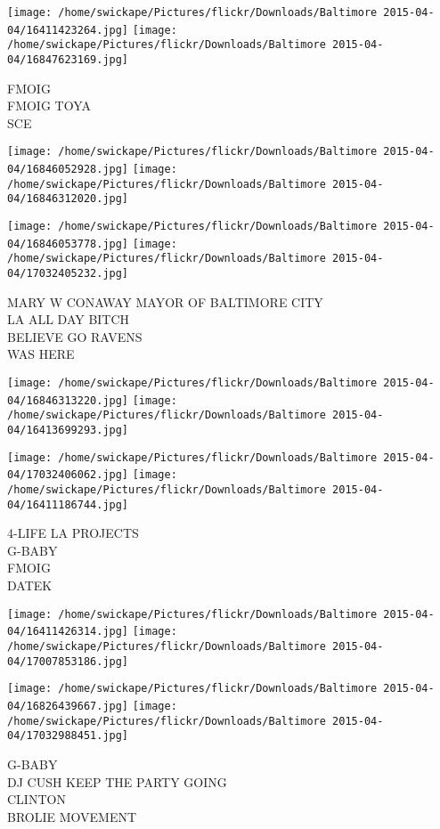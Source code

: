 \documentclass[10pt,letterpaper]{article}
\begin{document}
\vspace{0.25in}
\texttt{[image: /home/swickape/Pictures/flickr/Downloads/Baltimore 2015-04-04/16411423264.jpg]}
\texttt{[image: /home/swickape/Pictures/flickr/Downloads/Baltimore 2015-04-04/16847623169.jpg]}

FMOIG\\
FMOIG TOYA\\
SCE
\pagebreak

\texttt{[image: /home/swickape/Pictures/flickr/Downloads/Baltimore 2015-04-04/16846052928.jpg]}
\texttt{[image: /home/swickape/Pictures/flickr/Downloads/Baltimore 2015-04-04/16846312020.jpg]}

\texttt{[image: /home/swickape/Pictures/flickr/Downloads/Baltimore 2015-04-04/16846053778.jpg]}
\texttt{[image: /home/swickape/Pictures/flickr/Downloads/Baltimore 2015-04-04/17032405232.jpg]}

MARY W CONAWAY MAYOR OF BALTIMORE CITY\\
LA ALL DAY BITCH\\
BELIEVE GO RAVENS\\
WAS HERE
\pagebreak

\texttt{[image: /home/swickape/Pictures/flickr/Downloads/Baltimore 2015-04-04/16846313220.jpg]}
\texttt{[image: /home/swickape/Pictures/flickr/Downloads/Baltimore 2015-04-04/16413699293.jpg]}

\texttt{[image: /home/swickape/Pictures/flickr/Downloads/Baltimore 2015-04-04/17032406062.jpg]}
\texttt{[image: /home/swickape/Pictures/flickr/Downloads/Baltimore 2015-04-04/16411186744.jpg]}

4{-}LIFE LA PROJECTS\\
G{-}BABY\\
FMOIG\\
DATEK
\pagebreak

\texttt{[image: /home/swickape/Pictures/flickr/Downloads/Baltimore 2015-04-04/16411426314.jpg]}
\texttt{[image: /home/swickape/Pictures/flickr/Downloads/Baltimore 2015-04-04/17007853186.jpg]}

\texttt{[image: /home/swickape/Pictures/flickr/Downloads/Baltimore 2015-04-04/16826439667.jpg]}
\texttt{[image: /home/swickape/Pictures/flickr/Downloads/Baltimore 2015-04-04/17032988451.jpg]}

G{-}BABY\\
DJ CUSH KEEP THE PARTY GOING\\
CLINTON\\
BROLIE MOVEMENT
\pagebreak
\end{document}
